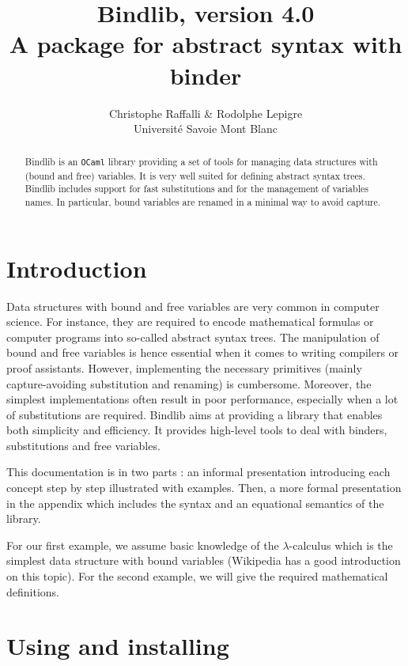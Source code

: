 \documentclass[11pt]{article}
\title{
  Bindlib, version 4.0 \\
  A package for abstract syntax with binder
}
\author{
  Christophe Raffalli \& Rodolphe Lepigre \\
  Université Savoie Mont Blanc
}
\begin{document}
\maketitle

\vspace{1cm}
\begin{abstract}
  Bindlib is an \verb#OCaml# library providing a set of tools for managing
  data structures with (bound and free) variables. It is very well suited for
  defining abstract syntax trees.
  Bindlib includes support for fast substitutions and for the management of
  variables names. In particular, bound variables are renamed in a minimal
  way to avoid capture.
\end{abstract}
\vspace{1cm}

\tableofcontents

\section{Introduction}

Data structures with bound and free variables are very common in computer
science. For instance, they are required to encode mathematical formulas or
computer programs into so-called abstract syntax trees. The manipulation of
bound and free variables is hence essential when it comes to writing
compilers or proof assistants. However, implementing the necessary primitives
(mainly capture-avoiding substitution and renaming) is cumbersome. Moreover,
the simplest implementations often result in poor performance, especially
when a lot of substitutions are required. Bindlib aims at providing a library
that enables both simplicity and efficiency. It provides high-level tools to
deal with binders, substitutions and free variables.

This documentation is in two parts : an informal presentation
introducing each concept step by step illustrated with examples. Then,
a more formal presentation in the appendix which includes the syntax
and an equational semantics of the library.

For our first example, we assume basic knowledge of the $\lambda$-calculus
which is the simplest data structure with bound variables (Wikipedia
has a good introduction on this topic). For the second example, we
will give the required mathematical definitions.

\section{Using and installing}
\end{document}
